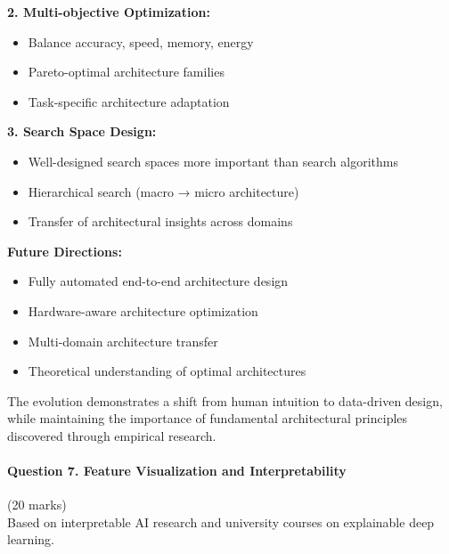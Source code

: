 \documentclass[12pt]{article}
\begin{document}
\begin{enumerate}[(a)]
{    \textbf{2. Multi-objective Optimization:}
    \begin{itemize}
        \item Balance accuracy, speed, memory, energy
        \item Pareto-optimal architecture families
        \item Task-specific architecture adaptation
    \end{itemize}
    
    \textbf{3. Search Space Design:}
    \begin{itemize}
        \item Well-designed search spaces more important than search algorithms
        \item Hierarchical search (macro → micro architecture)
        \item Transfer of architectural insights across domains
    \end{itemize}
    
    \textbf{Future Directions:}
    \begin{itemize}
        \item Fully automated end-to-end architecture design
        \item Hardware-aware architecture optimization
        \item Multi-domain architecture transfer
        \item Theoretical understanding of optimal architectures
    \end{itemize}
    
    The evolution demonstrates a shift from human intuition to data-driven design, while maintaining the importance of fundamental architectural principles discovered through empirical research.
    }
\end{enumerate}

\newpage
\paragraph{Question 7. Feature Visualization and Interpretability}{\hfill (20 marks)}\\
Based on interpretable AI research and university courses on explainable deep learning.
\end{document}
